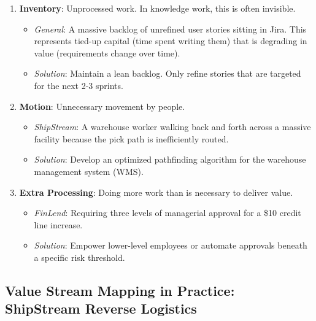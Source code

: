 \begin{enumerate}
  \begin{itemize}
  \tightlist
  \item
    \emph{FinLend}: Moving customer data between legacy systems via
    insecure, manual flat-file SFTP transfers instead of real-time APIs.
  \item
    \emph{Solution}: Define API contracts to integrate systems
    seamlessly.
  \end{itemize}
\item
  \textbf{Inventory}: Unprocessed work. In knowledge work, this is often
  invisible.

  \begin{itemize}
  \tightlist
  \item
    \emph{General}: A massive backlog of unrefined user stories sitting
    in Jira. This represents tied-up capital (time spent writing them)
    that is degrading in value (requirements change over time).
  \item
    \emph{Solution}: Maintain a lean backlog. Only refine stories that
    are targeted for the next 2-3 sprints.
  \end{itemize}
\item
  \textbf{Motion}: Unnecessary movement by people.

  \begin{itemize}
  \tightlist
  \item
    \emph{ShipStream}: A warehouse worker walking back and forth across
    a massive facility because the pick path is inefficiently routed.
  \item
    \emph{Solution}: Develop an optimized pathfinding algorithm for the
    warehouse management system (WMS).
  \end{itemize}
\item
  \textbf{Extra Processing}: Doing more work than is necessary to
  deliver value.

  \begin{itemize}
  \tightlist
  \item
    \emph{FinLend}: Requiring three levels of managerial approval for a
    \$10 credit line increase.
  \item
    \emph{Solution}: Empower lower-level employees or automate approvals
    beneath a specific risk threshold.
  \end{itemize}
\end{enumerate}

\subsection{Value Stream Mapping in Practice: ShipStream Reverse
Logistics}\label{value-stream-mapping-in-practice-shipstream-reverse-logistics}

